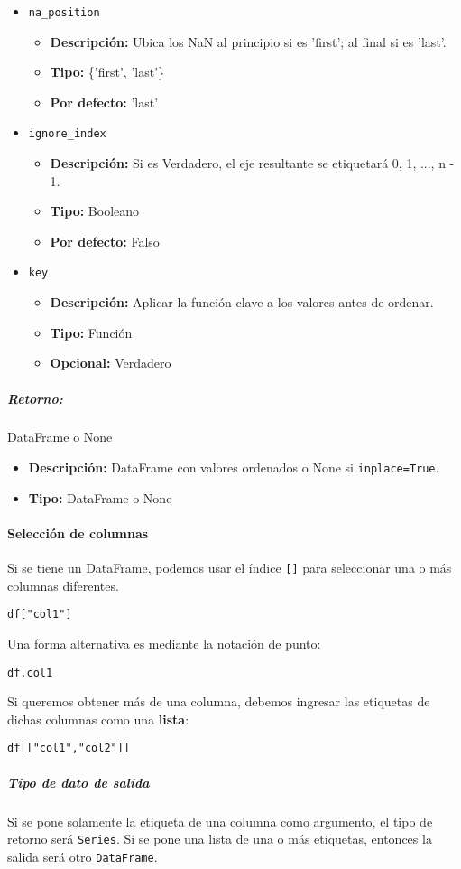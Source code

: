 \begin{itemize}
\begin{itemize}
\end{itemize}
\item \texttt{na\_position}
\begin{itemize}
\item \textbf{Descripción:} Ubica los NaN al principio si es 'first'; al final si es 'last'.
\item \textbf{Tipo:} \{'first', 'last'\}
\item \textbf{Por defecto:} 'last'
\end{itemize}
\item \texttt{ignore\_index}
\begin{itemize}
\item \textbf{Descripción:} Si es Verdadero, el eje resultante se etiquetará 0, 1, ..., n - 1.
\item \textbf{Tipo:} Booleano
\item \textbf{Por defecto:} Falso
\end{itemize}
\item \texttt{key}
\begin{itemize}
\item \textbf{Descripción:} Aplicar la función clave a los valores antes de ordenar.
\item \textbf{Tipo:} Función
\item \textbf{Opcional:} Verdadero
\end{itemize}
\end{itemize}
\subparagraph{Retorno:} DataFrame o None
\begin{itemize}
\item \textbf{Descripción:} DataFrame con valores ordenados o None si \texttt{inplace=True}.
\item \textbf{Tipo:} DataFrame o None
\end{itemize}
\paragraph{Selección de columnas}
Si se tiene un DataFrame, podemos usar el índice \texttt{[]} para seleccionar una o más columnas diferentes. 
\begin{verbatim}
df["col1"]
\end{verbatim}
Una forma alternativa es mediante la notación de punto:
\begin{verbatim}
df.col1
\end{verbatim}
Si queremos obtener más de una columna, debemos ingresar las etiquetas de dichas columnas como una \textbf{lista}:
\begin{verbatim}
df[["col1","col2"]]
\end{verbatim}
\subparagraph{Tipo de dato de salida} Si se pone solamente la etiqueta de una columna como argumento, el tipo de retorno será \texttt{Series}. Si se pone una lista de una o más etiquetas, entonces la salida será otro \texttt{DataFrame}.

